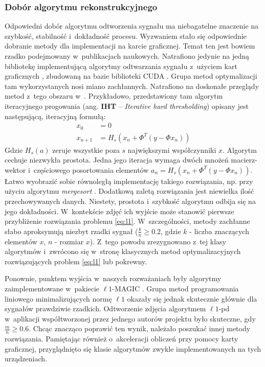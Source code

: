 \subsubsection{Dobór algorytmu rekonstrukcyjnego}
Odpowiedni dobór algorytmu odtworzenia sygnału ma niebagatelne znaczenie na szybkość, stabilność i~dokładność procesu. Wyzwaniem stało się odpowiednie dobranie metody dla implementacji na karcie graficznej. Temat ten jest bowiem rzadko podejmowany w~publikacjach naukowych. Natrafiono jedynie na jedną bibliotekę implementującą algorytmy odtwarzania sygnału z~użyciem kart graficznych \cite{GAGA}, zbudowaną na bazie biblioteki CUDA \cite{CUDA}. Grupa metod optymalizacji tam wykorzystanych nosi miano zachłannych. Natrafiono na doskonałe przeglądy metod z~tego obszaru w~\cite{Needell2009,Gronde2008}. Przykładowo, przedstawiony tam algorytm iteracyjnego progowania (ang. \textbf{IHT} -- \textit{Iterative hard thresholding}) \cite{Blumensath2009} opisany jest następującą, iteracyjną formułą: 
\begin{equation}
\begin{split}
    x_0 & = 0 \\ 
x_{n+1} & = H_s \left(x_n + \Phi^T(y - \Phi x_n) \right)
\end{split}
\end{equation}
\newline{}
Gdzie $H_s(a)$ zeruje wszystkie poza $s$ największymi współczynniki $x$. Algorytm cechuje niezwykła prostota. Jedna jego iteracja wymaga dwóch mnożeń macierz-wektor i~częściowego posortowania elementów $a_n =  H_s \left(x_n + \Phi^T(y - \Phi x_n) \right)$. Łatwo wyobrazić sobie równoległą implementację takiego rozwiązania, np. przy użyciu algorytmu \textit{mergesort} \cite{Thouti2012}. Dodatkową zaletą rozwiązania jest niewielka ilość przechowywanych danych. Niestety, prostota i~szybkość algorytmu odbija się na jego dokładności. W~kontekście zdjęć ich wyjście może stanowić pierwsze przybliżenie rozwiązania problemu \ref{eq:l1}. W~szczególności, metody zachłanne słabo aproksymują niezbyt rzadki sygnał ($\frac{k}{n} \ge 0.2$, gdzie $k$ - liczba znaczących elementów $x$, $n$ - rozmiar $x$). Z~tego powodu zrezygnowano z~tej klasy algorytmów i~zwrócono się w~stronę klasycznych metod optymalizacyjnych rozwiązujących problem \ref{eq:l1} lub pokrewny.

Ponownie, punktem wyjścia w~naszych rozważaniach były algorytmy zaimplementowane w~pakiecie $\ell 1$-MAGIC \cite{SinglePixelCameraCode}. Grupa metod programowania liniowego minimalizujących normę $\ell 1$ okazały się jednak skutecznie głównie dla sygnałów prawdziwie rzadkich. Odtworzenie zdjęcia algorytmem $\ell 1$-pd \cite{Boyd2004} w~aplikacji współtworzonej przez jednego autorów projektu \cite{PR12SIS306} było skuteczne, gdy $\frac{m}{n} \ge  0.6$. Chcąc znacząco poprawić ten wynik, należało poszukać innej metody rozwiązania. Pamiętając również o~akceleracji obliczeń przy pomocy karty graficznej, przyglądnięto się klasie algorytmów zwykle implementowanych na tych urządzeniach. 


